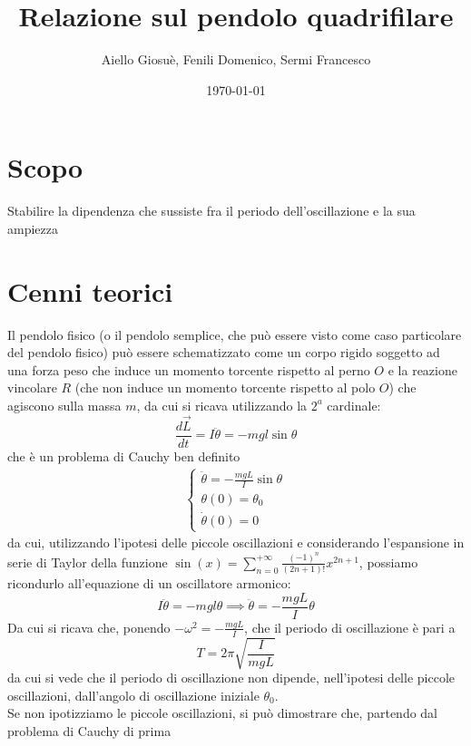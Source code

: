 \documentclass{article}
\title{Relazione sul pendolo quadrifilare}
\author{Aiello Giosuè, Fenili Domenico, Sermi Francesco}
\date{\today}
\begin{document}
	\maketitle
	\newpage
	\tableofcontents
	\newpage
	\section{Scopo}
		Stabilire la dipendenza che sussiste fra il periodo dell'oscillazione e la sua ampiezza
	\section{Cenni teorici}
	Il pendolo fisico (o il pendolo semplice, che può essere visto come caso particolare del pendolo fisico) può essere schematizzato come un corpo rigido soggetto ad una forza peso che induce un momento torcente rispetto al perno $O$ e la reazione vincolare $R$ (che non induce un momento torcente rispetto al polo $O$) che agiscono sulla massa $m$, da cui si ricava utilizzando la $2^a$ cardinale:
	\begin{equation}
		\frac{d\vec{L}}{dt} = I\ddot{\theta} = -mgl\sin{\theta}
	\end{equation}
	che è un problema di Cauchy ben definito
	\begin{align}
		\begin{cases*}
			\ddot{\theta} = - \frac{mgL}{I} \sin{\theta} \\
			\theta(0) = \theta_0 \\
			\dot{\theta}(0) = 0
		\end{cases*}
	\end{align}
	da cui, utilizzando l'ipotesi delle piccole oscillazioni e considerando l'espansione in serie di Taylor della funzione $\sin{(x)} = \sum\limits_{n=0}^{+\infty} \frac{(-1)^n}{(2n+1)!} x^{2n+1}$, possiamo ricondurlo all'equazione di un oscillatore armonico:
	\begin{equation}
		I\ddot{\theta} = -mgl\theta \implies \ddot\theta = -\frac{mgL}{I}\theta
	\end{equation}
	Da cui si ricava che, ponendo $-\omega^2 = -\frac{mgL}{I}$, che il periodo di oscillazione è pari a
	\begin{equation}
		T = 2\pi \sqrt{\frac{I}{mgL}}
	\end{equation}
	da cui si vede che il periodo di oscillazione non dipende, nell'ipotesi delle piccole oscillazioni, dall'angolo di oscillazione iniziale $\theta_0$. \\	
	Se non ipotizziamo le piccole oscillazioni, si può dimostrare che, partendo dal problema di Cauchy di prima
\end{document}
